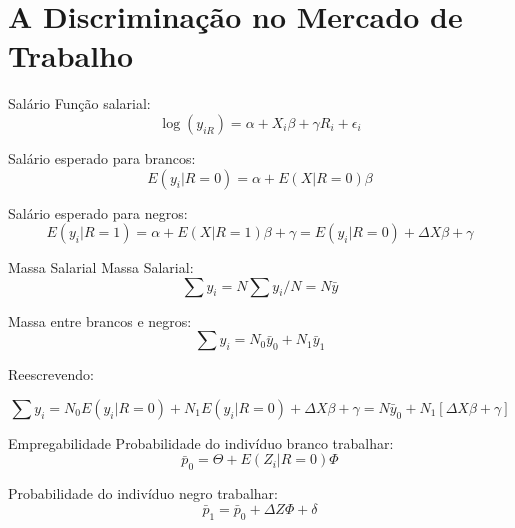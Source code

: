 \documentclass[10pt, xcolor=x11names,compress]{beamer}
\begin{document}
\section{A Discriminação no Mercado de Trabalho}

\begin{frame}{Salário}
	Função salarial:
	\begin{equation}
		\log(y_{iR}) = \alpha + X_{i}\beta + \gamma R_{i} + \epsilon_{i}
	\end{equation}
	
	Salário esperado para brancos:
	\begin{equation}
		E(y_{i}|R=0) = \alpha + E(X|R=0)\beta
	\end{equation}
	
	Salário esperado para negros:
	\begin{equation}
		E(y_{i}|R=1) = \alpha + E(X|R=1)\beta + \gamma = E(y_{i}|R=0) + \Delta X\beta + \gamma
	\end{equation}
\end{frame}

\begin{frame}{Massa Salarial}
	Massa Salarial:
	\begin{equation}
		\sum y_{i} = N \sum y_{i}/N = N \bar{y}
	\end{equation}
	
	Massa entre brancos e negros:
	\begin{equation}
		\sum y_{i} = N_{0} \bar{y}_{0} + N_{1} \bar{y}_{1}
	\end{equation}
	
	Reescrevendo:
	
	\begin{equation}
		\sum y_{i} = N_{0} E(y_{i}|R=0)  + N_{1} E(y_{i}|R=0)  + \Delta X\beta + \gamma =
		N \bar{y}_{0} + N_{1}[\Delta X\beta + \gamma]
	\end{equation}
	
\end{frame}

\begin{frame}{Empregabilidade}
	Probabilidade do indivíduo branco trabalhar:
	\begin{equation}
		\bar{p}_{0}= \Theta + E(Z_{i}|R=0) \Phi
	\end{equation}
	
		Probabilidade do indivíduo negro trabalhar:
	\begin{equation}
		\bar{p}_{1}= \bar{p}_{0} + \Delta Z \Phi + \delta
	\end{equation}
\end{frame}
	
\end{document}
